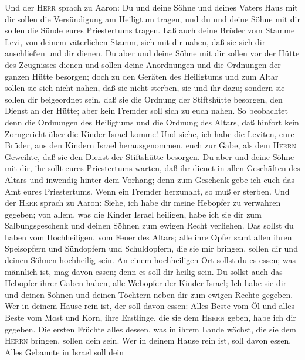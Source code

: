  Und der \textsc{Herr} sprach zu Aaron: Du und deine Söhne
und deines Vaters Haus mit dir sollen die Versündigung am Heiligtum
tragen, und du und deine Söhne mit dir sollen die Sünde eures
Priestertums tragen.  Laß auch deine Brüder vom Stamme
Levi, von deinem väterlichen Stamm, sich mit dir nahen, daß sie sich dir
anschließen und dir dienen. Du aber und deine Söhne mit dir sollen vor
der Hütte des Zeugnisses dienen und sollen deine Anordnungen und die
Ordnungen der ganzen Hütte besorgen;  doch zu den Geräten
des Heiligtums und zum Altar sollen sie sich nicht nahen, daß sie nicht
sterben, sie und ihr dazu;  sondern sie sollen dir
beigeordnet sein, daß sie die Ordnung der Stiftshütte besorgen, den
Dienst an der Hütte; aber kein Fremder soll sich zu euch nahen.
 So beobachtet denn die Ordnungen des Heiligtums und die
Ordnung des Altars, daß hinfort kein Zorngericht über die Kinder Israel
komme!  Und siehe, ich habe die Leviten, eure Brüder, aus
den Kindern Israel herausgenommen, euch zur Gabe, als dem \textsc{Herrn}
Geweihte, daß sie den Dienst der Stiftshütte besorgen.  Du
aber und deine Söhne mit dir, ihr sollt eures Priestertums warten, daß
ihr dienet in allen Geschäften des Altars und inwendig hinter dem
Vorhang; denn zum Geschenk gebe ich euch das Amt eures Priestertums.
Wenn ein Fremder herzunaht, so muß er sterben.  Und der
\textsc{Herr} sprach zu Aaron: Siehe, ich habe dir meine Hebopfer zu
verwahren gegeben; von allem, was die Kinder Israel heiligen, habe ich
sie dir zum Salbungsgeschenk und deinen Söhnen zum ewigen Recht
verliehen.  Das sollst du haben vom Hochheiligen, vom
Feuer des Altars; alle ihre Opfer samt allen ihren Speisopfern und
Sündopfern und Schuldopfern, die sie mir bringen, sollen dir und deinen
Söhnen hochheilig sein.  An einem hochheiligen Ort sollst
du es essen; was männlich ist, mag davon essen; denn es soll dir heilig
sein.  Du sollst auch das Hebopfer ihrer Gaben haben,
alle Webopfer der Kinder Israel; Ich habe sie dir und deinen Söhnen und
deinen Töchtern neben dir zum ewigen Rechte gegeben. Wer in deinem Hause
rein ist, der soll davon essen:  Alles Beste vom Öl und
alles Beste vom Most und Korn, ihre Erstlinge, die sie dem
\textsc{Herrn} geben, habe ich dir gegeben.  Die ersten
Früchte alles dessen, was in ihrem Lande wächst, die sie dem
\textsc{Herrn} bringen, sollen dein sein. Wer in deinem Hause rein ist,
soll davon essen.  Alles Gebannte in Israel soll dein
